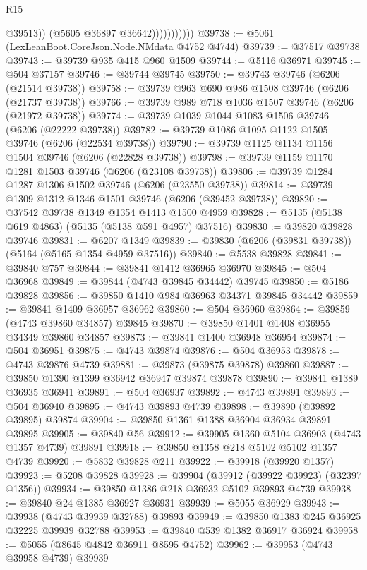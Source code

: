 \begin{lexlean}{R15}
\begin{coremodule}
{{{{{{{{{{{                            @39513))
                        (@5605 @36897 @36642)))))))))))
@39738 := @5061 (LexLeanBoot.CoreJson.Node.NMdata @4752 @4744)
@39739 := @37517 @39738
@39743 := @39739 @935 @415 @960 @1509
@39744 := @5116 @36971
@39745 := @504 @37157
@39746 := @39744 @39745
@39750 := @39743 @39746 (@6206 (@21514 @39738))
@39758 := @39739 @963 @690 @986 @1508 @39746 (@6206 (@21737 @39738))
@39766 := @39739 @989 @718 @1036 @1507 @39746 (@6206 (@21972 @39738))
@39774 := @39739 @1039 @1044 @1083 @1506 @39746 (@6206 (@22222 @39738))
@39782 := @39739 @1086 @1095 @1122 @1505 @39746 (@6206 (@22534 @39738))
@39790 := @39739 @1125 @1134 @1156 @1504 @39746 (@6206 (@22828 @39738))
@39798 := @39739 @1159 @1170 @1281 @1503 @39746 (@6206 (@23108 @39738))
@39806 := @39739 @1284 @1287 @1306 @1502 @39746 (@6206 (@23550 @39738))
@39814 := @39739 @1309 @1312 @1346 @1501 @39746 (@6206 (@39452 @39738))
@39820 := @37542 @39738 @1349 @1354 @1413 @1500 @4959
@39828 := @5135 (@5138 @619 @4863) (@5135 (@5138 @591 @4957) @37516)
@39830 := @39820 @39828 @39746
@39831 := @6207 @1349
@39839 := @39830 (@6206 (@39831 @39738)) (@5164 (@5165 @1354 @4959 @37516))
@39840 := @5538 @39828
@39841 := @39840 @757
@39844 := @39841 @1412 @36965 @36970
@39845 := @504 @36968
@39849 := @39844 (@4743 @39845 @34442) @39745
@39850 := @5186 @39828
@39856 := @39850 @1410 @984 @36963 @34371 @39845 @34442
@39859 := @39841 @1409 @36957 @36962
@39860 := @504 @36960
@39864 := @39859 (@4743 @39860 @34857) @39845
@39870 := @39850 @1401 @1408 @36955 @34349 @39860 @34857
@39873 := @39841 @1400 @36948 @36954
@39874 := @504 @36951
@39875 := @4743 @39874
@39876 := @504 @36953
@39878 := @4743 @39876 @4739
@39881 := @39873 (@39875 @39878) @39860
@39887 := @39850 @1390 @1399 @36942 @36947 @39874 @39878
@39890 := @39841 @1389 @36935 @36941
@39891 := @504 @36937
@39892 := @4743 @39891
@39893 := @504 @36940
@39895 := @4743 @39893 @4739
@39898 := @39890 (@39892 @39895) @39874
@39904 := @39850 @1361 @1388 @36904 @36934 @39891 @39895
@39905 := @39840 @56
@39912 := @39905 @1360 @5104 @36903 (@4743 @1357 @4739) @39891
@39918 := @39850 @1358 @218 @5102 @5102 @1357 @4739
@39920 := @5832 @39828 @211
@39922 := @39918 (@39920 @1357)
@39923 := @5208 @39828
@39928 := @39904 (@39912 (@39922 @39923) (@32397 @1356))
@39934 := @39850 @1386 @218 @36932 @5102 @39893 @4739
@39938 := @39840 @24 @1385 @36927 @36931
@39939 := @5055 @36929
@39943 := @39938 (@4743 @39939 @32788) @39893
@39949 := @39850 @1383 @245 @36925 @32225 @39939 @32788
@39953 := @39840 @539 @1382 @36917 @36924
@39958 := @5055 (@8645 @4842 @36911 @8595 @4752)
@39962 := @39953 (@4743 @39958 @4739) @39939
}}}}}}}}}}}
\end{coremodule}
\end{lexlean}
